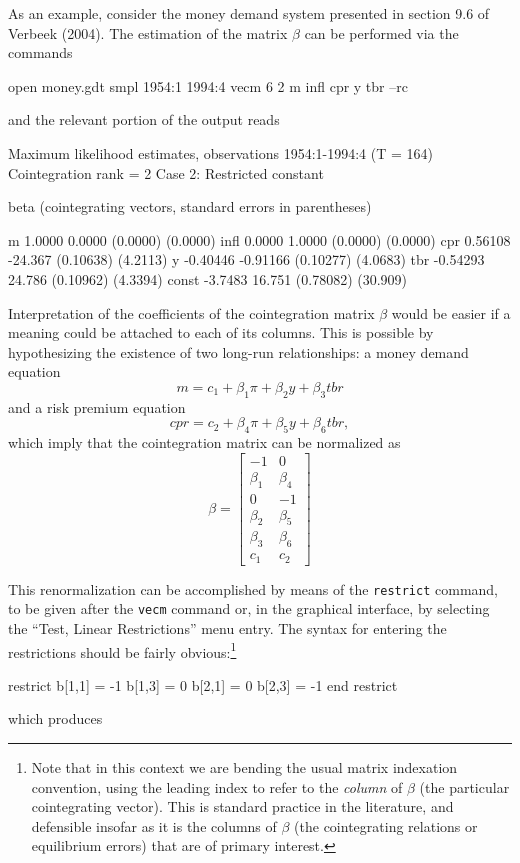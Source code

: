 As an example, consider the money demand system presented in section
9.6 of Verbeek (2004). The estimation of the matrix $\beta$ can be performed via
the commands
\begin{code}
  open money.gdt 
  smpl 1954:1 1994:4 
  vecm 6 2 m infl cpr y tbr --rc
\end{code}
and the relevant portion of the output reads
\begin{code}
Maximum likelihood estimates, observations 1954:1-1994:4 (T = 164)
Cointegration rank = 2
Case 2: Restricted constant

beta (cointegrating vectors, standard errors in parentheses)

m           1.0000       0.0000 
           (0.0000)     (0.0000) 
infl        0.0000       1.0000 
           (0.0000)     (0.0000) 
cpr        0.56108      -24.367 
          (0.10638)     (4.2113) 
y         -0.40446     -0.91166 
          (0.10277)     (4.0683) 
tbr       -0.54293       24.786 
          (0.10962)     (4.3394) 
const      -3.7483       16.751 
          (0.78082)     (30.909) 
\end{code}
Interpretation of the coefficients of the cointegration matrix $\beta$
would be easier if a meaning could be attached to each of its
columns. This is possible by hypothesizing the existence of two
long-run relationships: a money demand equation
\begin{equation}
  \label{eq:verbeek-mondem}
  m = c_1 + \beta_1 \pi + \beta_2 y + \beta_3 tbr
\end{equation}
and a risk premium equation
\begin{equation}
  \label{eq:verbeek-premium}
  cpr = c_2 + \beta_4 \pi + \beta_5 y + \beta_6 tbr ,
\end{equation}
which imply that the cointegration matrix can be normalized as
\[
  \beta = \left[
    \begin{array}{rr}
      -1 & 0 \\ \beta_1 & \beta_4 \\ 0 & -1 \\ \beta_2 & \beta_5
      \\ \beta_3 & \beta_6 \\ c_1 & c_2
    \end{array}
    \right]
\]

This renormalization can be accomplished by means of the
\texttt{restrict} command, to be given after the \texttt{vecm} command
or, in the graphical interface, by selecting the ``Test, Linear
Restrictions'' menu entry. The syntax for entering the restrictions
should be fairly obvious:\footnote{Note that in this context we are
  bending the usual matrix indexation convention, using the leading
  index to refer to the \textit{column} of $\beta$ (the particular
  cointegrating vector).  This is standard practice in the literature,
  and defensible insofar as it is the columns of $\beta$ (the
  cointegrating relations or equilibrium errors) that are of primary
  interest.}
\begin{code}
restrict
  b[1,1] = -1
  b[1,3] = 0
  b[2,1] = 0
  b[2,3] = -1
end restrict
\end{code}
which produces

